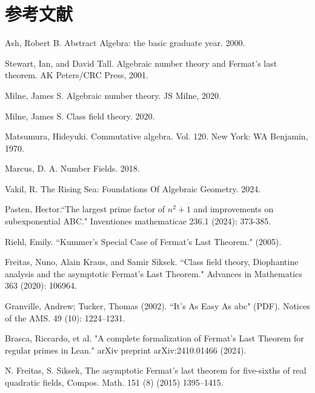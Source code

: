 \documentclass{article}
\begin{document}
\section{参考文献}

\begin{thebibliography}{99}

Ash, Robert B. Abstract Algebra: the basic graduate year. 2000.

Stewart, Ian, and David Tall. Algebraic number theory and Fermat's last theorem. AK Peters/CRC Press, 2001.

Milne, James S. Algebraic number theory. JS Milne, 2020.

Milne, James S. Class field theory. 2020.

Matsumura, Hideyuki. Commutative algebra. Vol. 120. New York: WA Benjamin, 1970.

Marcus, D. A. Number Fields. 2018.

Vakil, R. The Rising Sea: Foundations Of Algebraic Geometry. 2024.

Pasten, Hector.``The largest prime factor of $n^2+ 1$ and improvements on subexponential ABC." Inventiones mathematicae 236.1 (2024): 373-385.

Riehl, Emily. ``Kummer's Special Case of Fermat's Last Theorem." (2005).

Freitas, Nuno, Alain Kraus, and Samir Siksek. ``Class field theory, Diophantine analysis and the asymptotic Fermat's Last Theorem." Advances in Mathematics 363 (2020): 106964.

Granville, Andrew; Tucker, Thomas (2002). ``It's As Easy As abc" (PDF). Notices of the AMS. 49 (10): 1224–1231.

Brasca, Riccardo, et al. "A complete formalization of Fermat's Last Theorem for regular primes in Lean." arXiv preprint arXiv:2410.01466 (2024).

N. Freitas, S. Siksek, The asymptotic Fermat’s last theorem for five-sixths of real quadratic fields, Compos. Math. 151 (8) (2015) 1395–1415.

\end{thebibliography}
\end{document}

